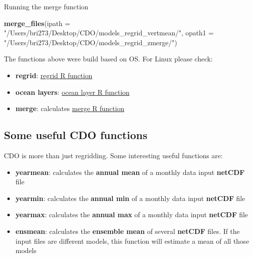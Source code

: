 \documentclass[]{book}
\newenvironment{Shaded}{\begin{snugshade}}{\end{snugshade}}
\newcommand{\DataTypeTok}[1]{\textcolor[rgb]{0.13,0.29,0.53}{#1}}
\newcommand{\KeywordTok}[1]{\textcolor[rgb]{0.13,0.29,0.53}{\textbf{#1}}}
\newcommand{\NormalTok}[1]{#1}
\newcommand{\StringTok}[1]{\textcolor[rgb]{0.31,0.60,0.02}{#1}}
\providecommand{\tightlist}{%
  \setlength{\itemsep}{0pt}\setlength{\parskip}{0pt}}
\begin{document}
Running the merge function

\begin{Shaded}
\begin{Highlighting}[]
\KeywordTok{merge_files}\NormalTok{(}\DataTypeTok{ipath =} \StringTok{"/Users/bri273/Desktop/CDO/models_regrid_vertmean/"}\NormalTok{,}
            \DataTypeTok{opath1 =} \StringTok{"/Users/bri273/Desktop/CDO/models_regrid_zmerge/"}\NormalTok{)}
\end{Highlighting}
\end{Shaded}

The functions above were build based on OS. For Linux please check:

\begin{itemize}
\tightlist
\item
  \textbf{regrid}: \href{https://github.com/IsaakBM/CDO-climate-data-operators-/blob/master/scripts/r_scripts/01_ClimateModels_regrid02_HPC.R}{regrid R function}
\item
  \textbf{ocean layers}: \href{https://github.com/IsaakBM/CDO-climate-data-operators-/blob/master/scripts/r_scripts/02_ClimateModels_olayers02_HPC.R}{ocean layer R function}
\item
  \textbf{merge}: calculates \href{https://github.com/IsaakBM/CDO-climate-data-operators-/blob/master/scripts/r_scripts/03_ClimateModels_MergeFiles02_HPC.R}{merge R function}
\end{itemize}

\hypertarget{some-useful-cdo-functions}{%
\subsection{Some useful CDO functions}\label{some-useful-cdo-functions}}

CDO is more than just regridding. Some interesting useful functions are:

\begin{itemize}
\tightlist
\item
  \textbf{yearmean}: calculates the \textbf{annual mean} of a monthly data input \textbf{netCDF} file
\item
  \textbf{yearmin}: calculates the \textbf{annual min} of a monthly data input \textbf{netCDF} file
\item
  \textbf{yearmax}: calculates the \textbf{annual max} of a monthly data input \textbf{netCDF} file
\item
  \textbf{ensmean}: calculates the \textbf{ensemble mean} of several \textbf{netCDF} files. If the input files are different models, this function will estimate a mean of all those models
\end{itemize}
\end{document}
